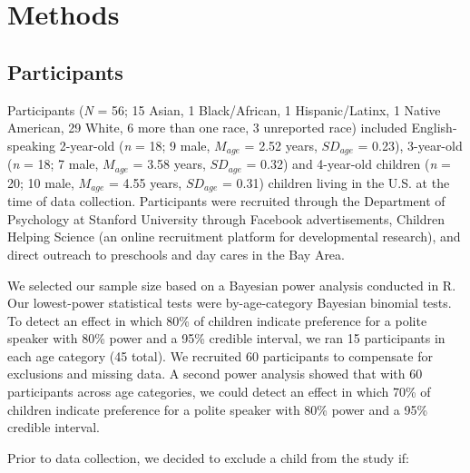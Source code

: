 \documentclass[
  english,
  man,floatsintext]{apa6}
\begin{document}
\hypertarget{methods}{%
\section{Methods}\label{methods}}

\hypertarget{participants}{%
\subsection{Participants}\label{participants}}

Participants (\emph{N} = 56; 15 Asian, 1 Black/African, 1 Hispanic/Latinx, 1 Native American, 29 White, 6 more than one race, 3 unreported race) included English-speaking 2-year-old (\emph{n} = 18; 9 male, \(M_{age}\) = 2.52 years, \(SD_{age}\) = 0.23), 3-year-old (\emph{n} = 18; 7 male, \(M_{age}\) = 3.58 years, \(SD_{age}\) = 0.32) and 4-year-old children (\emph{n} = 20; 10 male, \(M_{age}\) = 4.55 years, \(SD_{age}\) = 0.31) children living in the U.S. at the time of data collection. Participants were recruited through the Department of Psychology at Stanford University through Facebook advertisements, Children Helping Science (an online recruitment platform for developmental research), and direct outreach to preschools and day cares in the Bay Area.

We selected our sample size based on a Bayesian power analysis conducted in R. Our lowest-power statistical tests were by-age-category Bayesian binomial tests. To detect an effect in which 80\% of children indicate preference for a polite speaker with 80\% power and a 95\% credible interval, we ran 15 participants in each age category (45 total). We recruited 60 participants to compensate for exclusions and missing data. A second power analysis showed that with 60 participants across age categories, we could detect an effect in which 70\% of children indicate preference for a polite speaker with 80\% power and a 95\% credible interval.

Prior to data collection, we decided to exclude a child from the study if:
\end{document}

